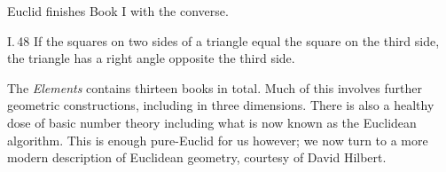 Euclid finishes Book I with the converse.

\begin{thm}{I.\,48}{}
	If the squares on two sides of a triangle equal the square on the third side, the  triangle has a right angle opposite the third side.
\end{thm}

The \emph{Elements} contains thirteen books in total. Much of this involves further geometric constructions, including in three dimensions. There is also a healthy dose of basic number theory including what is now known as the Euclidean algorithm. This is enough pure-Euclid for us however; we now turn to a more modern description of Euclidean geometry, courtesy of David Hilbert.

\clearpage

% 
% 
% 
% 
% 
% 
% 


